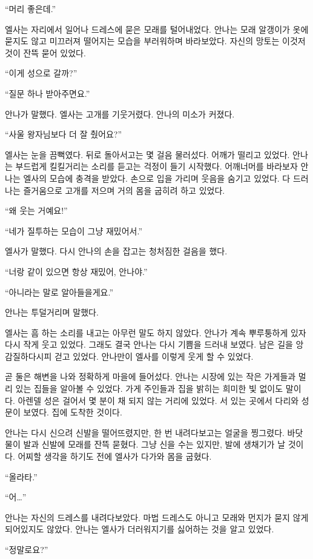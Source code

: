 ``머리 좋은데.''

엘사는 자리에서 일어나 드레스에 묻은 모래를 털어내었다. 안나는 모래 알갱이가 옷에 묻지도 않고 미끄러져 떨어지는 모습을 부러워하며 바라보았다. 자신의 망토는 이것저것이 잔뜩 묻어 있었다.

``이게 성으로 갈까?''

``질문 하나 받아주면요.''

안나가 말했다. 엘사는 고개를 기웃거렸다. 안나의 미소가 커졌다.

``사울 왕자님보다 더 잘 췄어요?''

엘사는 눈을 끔뻑였다. 뒤로 돌아서고는 몇 걸음 물러섰다. 어깨가 떨리고 있었다. 안나는 부드럽게 킬킬거리는 소리를 듣고는 걱정이 들기 시작했다. 어깨너머를 바라보자 안나는 엘사의 모습에 충격을 받았다. 손으로 입을 가리며 웃음을 숨기고 있었다. 다 드러나는 즐거움으로 고개를 저으며 거의 몸을 굽히려 하고 있었다.

``왜 웃는 거예요!''

``네가 질투하는 모습이 그냥 재밌어서.''

엘사가 말했다. 다시 안나의 손을 잡고는 청처짐한 걸음을 했다.

``너랑 같이 있으면 항상 재밌어, 안나야.''

``아니라는 말로 알아들을게요.''

안나는 투덜거리며 말했다.

엘사는 흠 하는 소리를 내고는 아무런 말도 하지 않았다. 안나가 계속 뿌루퉁하게 있자 다시 작게 웃고 있었다. 그래도 결국 안나는 다시 기쁨을 드러내 보였다. 남은 길을 앙감질하다시피 걷고 있었다. 안나만이 엘사를 이렇게 웃게 할 수 있었다.

곧 둘은 해변을 나와 정확하게 마을에 들어섰다. 안나는 시장에 있는 작은 가게들과 멀리 있는 집들을 알아볼 수 있었다. 가게 주인들과 집을 밝히는 희미한 빛 없이도 말이다. 아렌델 성은 걸어서 몇 분이 채 되지 않는 거리에 있었다. 서 있는 곳에서 다리와 성문이 보였다. 집에 도착한 것이다.

안나는 다시 신으려 신발을 떨어뜨렸지만, 한 번 내려다보고는 얼굴을 찡그렸다. 바닷물이 발과 신발에 모래를 잔뜩 묻혔다. 그냥 신을 수는 있지만, 발에 생채기가 날 것이다. 어찌할 생각을 하기도 전에 엘사가 다가와 몸을 굽혔다.

``올라타.''

``어\ldots''

안나는 자신의 드레스를 내려다보았다. 마법 드레스도 아니고 모래와 먼지가 묻지 않게 되어있지도 않았다. 안나는 엘사가 더러워지기를 싫어하는 것을 알고 있었다.

``정말로요?''

